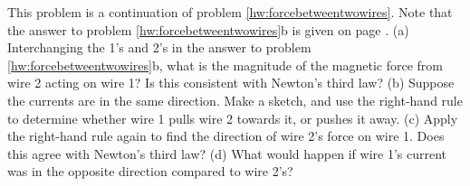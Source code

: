This problem is a continuation of problem \ref{hw:forcebetweentwowires}. Note that the
        answer to problem \ref{hw:forcebetweentwowires}b is given on page \pageref{hwans:forcebetweentwowires}.\hwendpart
        (a) Interchanging the 1's and 2's in the answer to problem \ref{hw:forcebetweentwowires}b,
        what is the magnitude of the magnetic force from wire 2 acting on wire 1? Is this consistent with
        Newton's third law?\hwendpart
        (b) Suppose the currents are in the same direction. Make a sketch, and use the
        right-hand rule to determine whether wire 1 pulls wire 2 towards it, or pushes it
        away.\hwendpart
        (c) Apply the right-hand rule again to find the direction of wire 2's force on
        wire 1. Does this agree with Newton's third law?\hwendpart
        (d) What would happen if wire 1's current was in the opposite direction compared
        to wire 2's?
